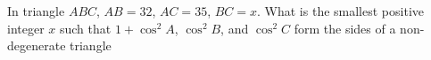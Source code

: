 In triangle $ABC$, $AB = 32$, $AC = 35$, $BC = x$. What is the smallest positive integer $x$ such that $1 + \cos^2 A$, $\cos^2 B$, and $\cos^2 C$ form the sides of a non-degenerate triangle
